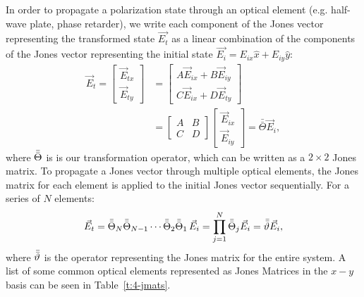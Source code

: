 In order to propagate a polarization state through an optical element (e.g. half-wave plate, phase retarder), we write each component of the Jones vector representing the transformed state $\vec{E_t}$ as a linear combination of the components of the Jones vector representing the initial state $\vec{E_i} = E_{ix}\hat{x}+E_{iy}\hat{y}$:
\begin{align}
\vec{E}_t = \left [ \begin{array}{c} \vec{E}_{tx} \\ \vec{E}_{ty} \end{array} \right ] &= \left [ \begin{array}{c} A \vec{E}_{ix} + B \vec{E}_{iy} \\ C \vec{E}_{ix}+ D \vec{E}_{ty} \end{array} \right ] \nonumber \\
&= \left [ \begin{array}{cc} A & B \\C & D \end{array} \right ]\left [ \begin{array}{c} \vec{E}_{ix} \\ \vec{E}_{iy} \end{array} \right ] = \bar{\bar{\Theta}} \vec{E}_i ,
\end{align}
where $\bar{\bar{\Theta}}$ is is our transformation operator, which can be written as a $2 \times 2$ Jones matrix.
To propagate a Jones vector through multiple optical elements, the Jones matrix for each element is applied to the initial Jones vector sequentially.
For a series of $N$ elements:
\begin{equation}
\vec{E}_t = \bar{\bar{\Theta}}_N \bar{\bar{\Theta}}_{N-1} \cdots \bar{\bar{\Theta}}_2 \bar{\bar{\Theta}}_1\, \vec{E}_i = \prod^N_{j=1} \bar{\bar{\Theta}}_j \vec{E}_i = \bar{\bar{\vartheta}} \vec{E}_i,
\end{equation}
where $\bar{\bar{\vartheta}}$ is the operator representing the Jones matrix for the entire system.
A list of some common optical elements represented as Jones Matrices in the $x-y$ basis can be seen in Table~\ref{t:4-jmats}.
